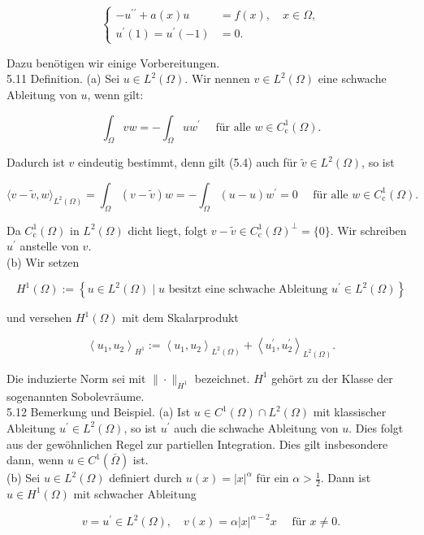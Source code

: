 \documentclass[10pt, letterpaper]{article}
\begin{document}
$$
\left\{\begin{aligned}
-u^{\prime \prime}+a(x) u & =f(x), \quad x \in \Omega, \\
u^{\prime}(1)=u^{\prime}(-1) & =0 .
\end{aligned}\right.
$$

Dazu benötigen wir einige Vorbereitungen.\\
5.11 Definition. (a) Sei $u \in L^{2}(\Omega)$. Wir nennen $v \in L^{2}(\Omega)$ eine schwache Ableitung von $u$, wenn gilt:

$$
\int_{\Omega} v w=-\int_{\Omega} u w^{\prime} \quad \text { für alle } w \in C_{\mathrm{c}}^{1}(\Omega) .
$$

Dadurch ist $v$ eindeutig bestimmt, denn gilt (5.4) auch für $\tilde{v} \in L^{2}(\Omega)$, so ist

$$
\langle v-\tilde{v}, w\rangle_{L^{2}(\Omega)}=\int_{\Omega}(v-\tilde{v}) w=-\int_{\Omega}(u-u) w^{\prime}=0 \quad \text { für alle } w \in C_{\mathrm{c}}^{1}(\Omega) .
$$

Da $C_{\mathrm{c}}^{1}(\Omega)$ in $L^{2}(\Omega)$ dicht liegt, folgt $v-\tilde{v} \in C_{\mathrm{c}}^{1}(\Omega)^{\perp}=\{0\}$. Wir schreiben $u^{\prime}$ anstelle von $v$.\\
(b) Wir setzen

$$
H^{1}(\Omega):=\left\{u \in L^{2}(\Omega) \mid u \text { besitzt eine schwache Ableitung } u^{\prime} \in L^{2}(\Omega)\right\}
$$

und versehen $H^{1}(\Omega)$ mit dem Skalarprodukt

$$
\left\langle u_{1}, u_{2}\right\rangle_{H^{1}}:=\left\langle u_{1}, u_{2}\right\rangle_{L^{2}(\Omega)}+\left\langle u_{1}^{\prime}, u_{2}^{\prime}\right\rangle_{L^{2}(\Omega)} .
$$

Die induzierte Norm sei mit $\|\cdot\|_{H^{1}}$ bezeichnet. $H^{1}$ gehört zu der Klasse der sogenannten Sobolevräume.\\
5.12 Bemerkung und Beispiel. (a) Ist $u \in C^{1}(\Omega) \cap L^{2}(\Omega)$ mit klassischer Ableitung $u^{\prime} \in L^{2}(\Omega)$, so ist $u^{\prime}$ auch die schwache Ableitung von $u$. Dies folgt aus der gewöhnlichen Regel zur partiellen Integration. Dies gilt insbesondere dann, wenn $u \in C^{1}(\bar{\Omega})$ ist.\\
(b) Sei $u \in L^{2}(\Omega)$ definiert durch $u(x)=|x|^{\alpha}$ für ein $\alpha>\frac{1}{2}$. Dann ist $u \in H^{1}(\Omega)$ mit schwacher Ableitung

$$
v=u^{\prime} \in L^{2}(\Omega), \quad v(x)=\alpha|x|^{\alpha-2} x \quad \text { für } x \neq 0 .
$$
\end{document}

